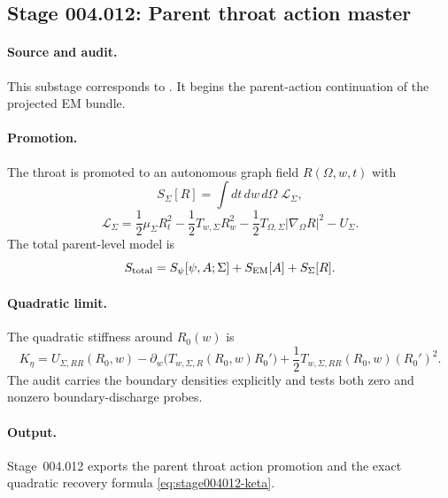\subsection*{Stage 004.012: Parent throat action master}
\label{subsec:stage004012-parent-throat-action-master}

\paragraph{Source and audit.}
This substage corresponds to
.
It begins the parent-action continuation of the projected EM bundle.

\paragraph{Promotion.}
The throat is promoted to an autonomous graph field \(R(\Omega,w,t)\) with
\begin{equation}
\label{eq:stage004005-parent-action}
S_\Sigma[R]=\int dt\,dw\,d\Omega\;\mathcal L_\Sigma,
\end{equation}
\begin{equation}
\label{eq:stage004012-parent-density}
\mathcal L_\Sigma
=\frac12\mu_\Sigma R_t^2
-\frac12T_{w,\Sigma}R_w^2
-\frac12T_{\Omega,\Sigma}|\nabla_\Omega R|^2
-U_\Sigma .
\end{equation}
The total parent-level model is
\begin{equation}
\label{eq:stage004012-total-action}
S_{\rm total}=S_\psi[\psi,A;\Sigma]+S_{\rm EM}[A]+S_\Sigma[R].
\end{equation}

\paragraph{Quadratic limit.}
The quadratic stiffness around \(R_0(w)\) is
\begin{equation}
\label{eq:stage004012-keta}
K_\eta=
U_{\Sigma,RR}(R_0,w)
-\partial_w\!\bigl(T_{w,\Sigma,R}(R_0,w)R_0'\bigr)
+\frac12T_{w,\Sigma,RR}(R_0,w)(R_0')^2.
\end{equation}
The audit carries the boundary densities explicitly and tests both zero and
nonzero boundary-discharge probes.

\paragraph{Output.}
Stage~004.012 exports the parent throat action promotion and the exact
quadratic recovery formula \eqref{eq:stage004012-keta}.
